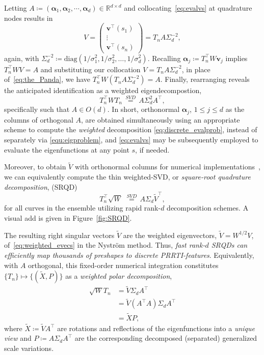 \documentclass[pdflatex,iicol]{sn-jnl}%
\theoremstyle{thmstyleone}%
\theoremstyle{thmstyletwo}%
\theoremstyle{thmstylethree}%
\begin{document}
Letting $A \coloneqq (\boldsymbol{\alpha}_1,\boldsymbol{\alpha}_2,\cdots,\boldsymbol{\alpha}_d)\in \mathbb{R}^{d \times d}$ and collocating~\eqref{eq:evalvs} at quadrature nodes results in
$$
V = \left( \begin{matrix}
    \boldsymbol{v}^{\top}(s_1)\\
    \vdots\\
    \boldsymbol{v}^{\top}(s_n)
\end{matrix} \right) = T_n A \Sigma_d^{-2},
$$
again, with $\Sigma_d^{-2} \coloneqq \text{diag}(1/\sigma_1^2, 1/\sigma_2^2 , \dots, 1/\sigma^2_d)$. Recalling $
\boldsymbol{\alpha}_j \coloneqq T_n^{\top}W \mathbf{v}_j
$
implies
$
T_n^{\top} W V = A
$
and substituting our collocation $V = T_n A \Sigma_d^{-2}$, in place of~\eqref{eq:the_Panda}, we have
$
T_n^{\top}W(T_nA \Sigma_d^{-2}) = A.
$
Finally, rearranging reveals the anticipated identification as a weighted eigendecompostion,
\begin{equation}\label{eq:discrete_evalprob}
T^{\top}_nWT_n \,\overset{SVD}{=}\, A\Sigma^2_dA^{\top},
\end{equation}
specifically such that $A \in O(d)$. In short, orthonormal $\boldsymbol \alpha_j$, $1\leq j \leq d$ as the columns of orthogonal $A$, are obtained simultaneously using an appropriate scheme to compute the \emph{weighted} decomposition \eqref{eq:discrete_evalprob}, instead of separately via \eqref{equ:eigproblem}, and \eqref{eq:evalvs} may be subsequently employed to evaluate the eigenfunctions at any point $s$, if needed. 

Moreover, to obtain $\widetilde{V}$ with orthonormal columns for numerical implementations~\cite{grey2023separable}, we can equivalently compute the thin weighted-SVD, or \textit{square-root quadrature decomposition}, (SRQD)
\begin{equation} \label{eq:SRQD}
    T_n^{\top}\sqrt{W}\,\,\overset{SVD}{=}\, A\Sigma_d\widetilde{V}^{\top},
\end{equation}
for all curves in the ensemble utilizing rapid rank-$d$ decomposition schemes. A visual add is given in Figure~\ref{fig:SRQD}.

The resulting right singular vectors $\widetilde{V}$ are the weighted eigenvectors, $\widetilde{V} = W^{1/2}V$, of~\eqref{eq:weighted_evecs} in the Nystr\"om method. Thus, \textit{fast rank-$d$ SRQDs can efficiently map thousands of preshapes to discrete PRRTI-features}. Equivalently, with $A$ orthogonal, this fixed-order numerical integration constitutes $\lbrace T_n \rbrace \mapsto \lbrace (\widetilde{X}, P)\rbrace$ as a \textit{weighted polar decomposition}, 
\begin{align} \label{eq:derived_polar_decomp}
    \sqrt{W}T_n &= \widetilde{V} \Sigma_dA^{\top}\\ \nonumber
    & = \widetilde{V}(A^{\top}A)\Sigma_dA^{\top}\\ \nonumber
    &=\widetilde{X}P, \nonumber
\end{align}
where $\widetilde{X} \coloneqq \widetilde{V}A^{\top}$ are rotations and reflections of the eigenfunctions into a \textit{unique view} and $P \coloneqq A \Sigma_dA^{\top}$ are the corresponding decomposed (separated) generalized scale variations. 
\end{document}
